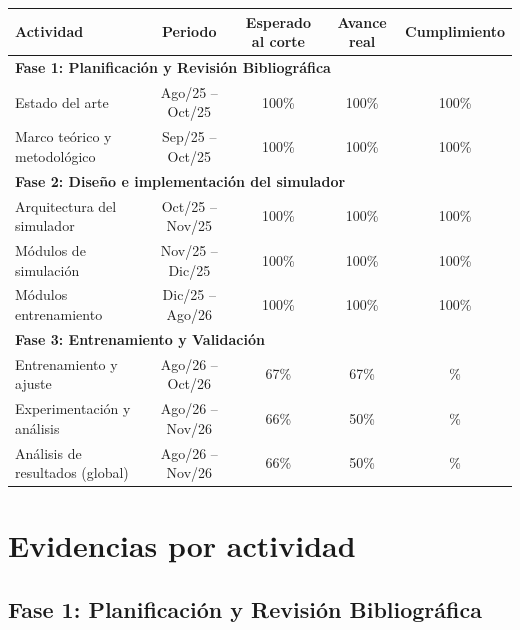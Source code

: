 \documentclass[letterpaper,10pt,oneside]{article}
\def\espEntrenamiento{67}   \def\realEntrenamiento{67}
\def\espExperimentos{66}    \def\realExperimentos{50}
\def\espAnalisis{66}        \def\realAnalisis{50}
\newcommand\cumplimiento[2]{\fpeval{min(100, round(100*(#2)/(#1), 0))}\%}
\begin{document}
	\begin{table}[H]
		\centering
		\renewcommand{\arraystretch}{1.2}
		\begin{tabular}{l c c c c}
			\toprule
			\textbf{Actividad} & \textbf{Periodo} & \textbf{Esperado al corte} & \textbf{Avance real} & \textbf{Cumplimiento} \\
			\midrule
			\multicolumn{5}{l}{\textbf{Fase 1: Planificación y Revisión Bibliográfica}} \\
			Estado del arte                  & Ago/25 -- Oct/25 & 100\% & 100\% & 100\% \\
			Marco teórico y metodológico     & Sep/25 -- Oct/25 & 100\% & 100\% & 100\% \\
			\multicolumn{5}{l}{\textbf{Fase 2: Diseño e implementación del simulador}} \\
			Arquitectura del simulador       & Oct/25 -- Nov/25 & 100\% & 100\% & 100\% \\
			Módulos de simulación            & Nov/25 -- Dic/25 & 100\% & 100\% & 100\% \\
			Módulos entrenamiento            & Dic/25 -- Ago/26 & 100\% & 100\% & 100\% \\
			\multicolumn{5}{l}{\textbf{Fase 3: Entrenamiento y Validación}} \\
			Entrenamiento y ajuste           & Ago/26 -- Oct/26 & \espEntrenamiento\% & \realEntrenamiento\% & \cumplimiento{\espEntrenamiento}{\realEntrenamiento} \\
			Experimentación y análisis       & Ago/26 -- Nov/26 & \espExperimentos\%  & \realExperimentos\%  & \cumplimiento{\espExperimentos}{\realExperimentos} \\
			Análisis de resultados (global)  & Ago/26 -- Nov/26 & \espAnalisis\%      & \realAnalisis\%      & \cumplimiento{\espAnalisis}{\realAnalisis} \\
			\bottomrule
		\end{tabular}
	\end{table}

	\section{Evidencias por actividad}

	\subsection*{Fase 1: Planificación y Revisión Bibliográfica}
\end{document}
